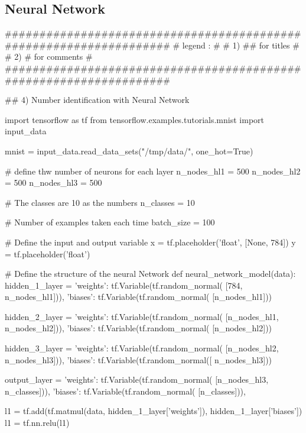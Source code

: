 \documentclass[11pt]{article}
\begin{document}
\subsection{Neural Network}
\begin{python}
###################################################################
# legend :                                                        #
#         1) ## for titles                                        #
#         2) #  for comments                                      #
###################################################################

## 4) Number identification with Neural Network

import tensorflow as tf
from tensorflow.examples.tutorials.mnist import input_data

mnist = input_data.read_data_sets("/tmp/data/", one_hot=True)

# define thw number of neurons for each layer
n_nodes_hl1 = 500
n_nodes_hl2 = 500
n_nodes_hl3 = 500

# The classes are 10 as the numbers
n_classes = 10

# Number of examples taken each time
batch_size = 100

# Define the input and output variable
x = tf.placeholder('float', [None, 784])
y = tf.placeholder('float')

# Define the structure of the neural Network
def neural_network_model(data):
    hidden_1_layer = {'weights': tf.Variable(tf.random_normal(
        [784, n_nodes_hl1])),
                      'biases': tf.Variable(tf.random_normal(
                          [n_nodes_hl1]))}

    hidden_2_layer = {'weights': tf.Variable(tf.random_normal(
        [n_nodes_hl1, n_nodes_hl2])),
                      'biases': tf.Variable(tf.random_normal(
                          [n_nodes_hl2]))}

    hidden_3_layer = {'weights': tf.Variable(tf.random_normal(
        [n_nodes_hl2, n_nodes_hl3])),
                      'biases': tf.Variable(tf.random_normal([
                          n_nodes_hl3]))}

    output_layer = {'weights': tf.Variable(tf.random_normal(
        [n_nodes_hl3, n_classes])),
                    'biases': tf.Variable(tf.random_normal(
                        [n_classes])), }

    l1 = tf.add(tf.matmul(data, hidden_1_layer['weights']),
                hidden_1_layer['biases'])
    l1 = tf.nn.relu(l1)


\end{python}
\end{document}
